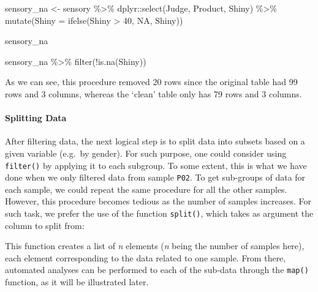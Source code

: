 \documentclass[
]{book}
\newenvironment{Shaded}{\begin{snugshade}}{\end{snugshade}}
\newcommand{\AttributeTok}[1]{\textcolor[rgb]{0.77,0.63,0.00}{#1}}
\newcommand{\ConstantTok}[1]{\textcolor[rgb]{0.00,0.00,0.00}{#1}}
\newcommand{\DecValTok}[1]{\textcolor[rgb]{0.00,0.00,0.81}{#1}}
\newcommand{\FunctionTok}[1]{\textcolor[rgb]{0.00,0.00,0.00}{#1}}
\newcommand{\NormalTok}[1]{#1}
\newcommand{\OtherTok}[1]{\textcolor[rgb]{0.56,0.35,0.01}{#1}}
\newcommand{\SpecialCharTok}[1]{\textcolor[rgb]{0.00,0.00,0.00}{#1}}
\begin{document}
\begin{Shaded}
\begin{Highlighting}[]
\NormalTok{sensory\_na }\OtherTok{\textless{}{-}}\NormalTok{ sensory }\SpecialCharTok{\%\textgreater{}\%} 
\NormalTok{  dplyr}\SpecialCharTok{::}\FunctionTok{select}\NormalTok{(Judge, Product, Shiny) }\SpecialCharTok{\%\textgreater{}\%} 
  \FunctionTok{mutate}\NormalTok{(}\AttributeTok{Shiny =} \FunctionTok{ifelse}\NormalTok{(Shiny }\SpecialCharTok{\textgreater{}} \DecValTok{40}\NormalTok{, }\ConstantTok{NA}\NormalTok{, Shiny))}

\NormalTok{sensory\_na}

\NormalTok{sensory\_na }\SpecialCharTok{\%\textgreater{}\%} 
  \FunctionTok{filter}\NormalTok{(}\SpecialCharTok{!}\FunctionTok{is.na}\NormalTok{(Shiny))}
\end{Highlighting}
\end{Shaded}

As we can see, this procedure removed 20 rows since the original table had 99 rows and 3 columns, whereas the `clean' table only has 79 rows and 3 columns.

\hypertarget{splitting-data}{%
\paragraph{Splitting Data}\label{splitting-data}}

After filtering data, the next logical step is to split data into subsets based on a given variable (e.g.~by gender). For such purpose, one could consider using \texttt{filter()} by applying it to each subgroup. To some extent, this is what we have done when we only filtered data from sample \texttt{P02}. To get sub-groups of data for each sample, we could repeat the same procedure for all the other samples. However, this procedure becomes tedious as the number of samples increases.
For such task, we prefer the use of the function \texttt{split()}, which takes as argument the column to split from:

\begin{Shaded}
\end{Shaded}

This function creates a list of \emph{n} elements (\emph{n} being the number of samples here), each element corresponding to the data related to one sample.
From there, automated analyses can be performed to each of the sub-data through the \texttt{map()} function, as it will be illustrated later.
\end{document}
